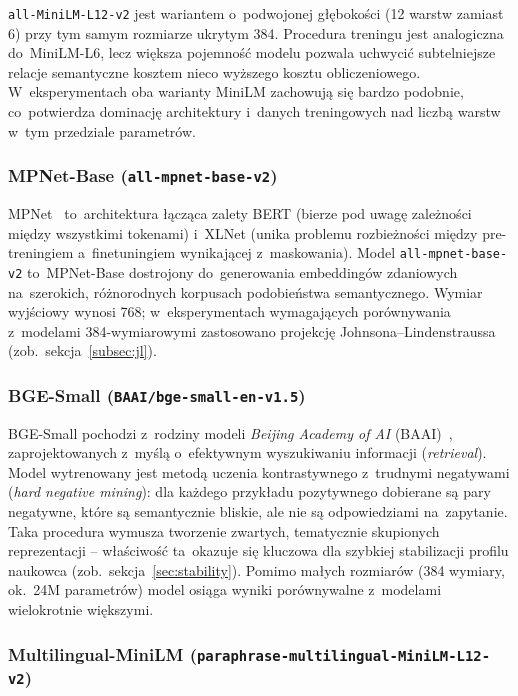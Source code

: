 \texttt{all-MiniLM-L12-v2} jest wariantem o~podwojonej głębokości
(12 warstw zamiast 6) przy tym samym rozmiarze ukrytym 384.
Procedura treningu jest analogiczna do~MiniLM-L6,
lecz większa pojemność modelu pozwala uchwycić subtelniejsze
relacje semantyczne kosztem nieco wyższego kosztu obliczeniowego.
W~eksperymentach oba warianty MiniLM zachowują się bardzo podobnie,
co~potwierdza dominację architektury i~danych treningowych
nad liczbą warstw w~tym przedziale parametrów.

\subsubsection{MPNet-Base (\texttt{all-mpnet-base-v2})}

MPNet~\cite{mpnet2020} to~architektura łącząca zalety BERT
(bierze pod uwagę zależności między wszystkimi tokenami)
i~XLNet (unika problemu rozbieżności między pre-treningiem
a~finetuningiem wynikającej z~maskowania).
Model \texttt{all-mpnet-base-v2} to~MPNet-Base
dostrojony do~generowania embeddingów zdaniowych na~szerokich,
różnorodnych korpusach podobieństwa semantycznego.
Wymiar wyjściowy wynosi 768; w~eksperymentach wymagających
porównywania z~modelami 384-wymiarowymi zastosowano
projekcję Johnsona--Lindenstraussa (zob.\ sekcja~\ref{subsec:jl}).

\subsubsection{BGE-Small (\texttt{BAAI/bge-small-en-v1.5})}

BGE-Small pochodzi z~rodziny modeli \textit{Beijing Academy of AI}
(BAAI)~\cite{bge2023}, zaprojektowanych z~myślą o~efektywnym
wyszukiwaniu informacji (\textit{retrieval}).
Model wytrenowany jest metodą uczenia kontrastywnego
z~trudnymi negatywami (\textit{hard negative mining}):
dla każdego przykładu pozytywnego dobierane są pary negatywne,
które są semantycznie bliskie, ale nie są odpowiedziami na~zapytanie.
Taka procedura wymusza tworzenie zwartych, tematycznie skupionych
reprezentacji -- właściwość ta~okazuje się kluczowa
dla szybkiej stabilizacji profilu naukowca
(zob.\ sekcja~\ref{sec:stability}).
Pomimo małych rozmiarów (384 wymiary, ok.~24M parametrów)
model osiąga wyniki porównywalne z~modelami wielokrotnie większymi.

\subsubsection{Multilingual-MiniLM (\texttt{paraphrase-multilingual-MiniLM-L12-v2})}

